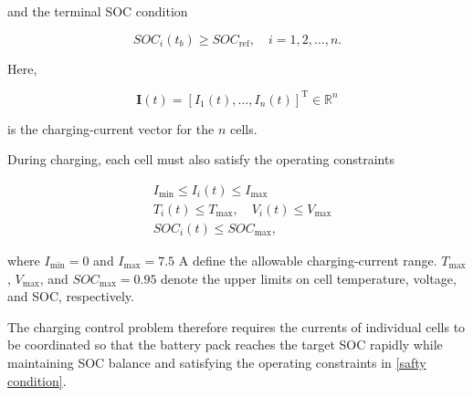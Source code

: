 and the terminal SOC condition

\begin{equation}\label{terminal condition}
    SOC_i(t_b)\geq SOC_{\mathrm{ref}},
    \quad i=1,2,\ldots,n.
\end{equation}

Here,

\begin{equation*}
    \mathbf{I}(t)
    =
    \left[
    I_1(t),\ldots,I_n(t)
    \right]^{\mathrm{T}}
    \in \mathbb{R}^{n}
\end{equation*}

is the charging-current vector for the $n$ cells.

During charging, each cell must also satisfy the operating constraints

\begin{equation}\label{safty condition}
    \begin{array}{rl}
    & I_{\min} \leq I_i(t) \leq I_{\max} \\[4pt]
    & T_i(t) \leq T_{\max}, \quad V_i(t) \leq V_{\max} \\[4pt]
    & SOC_i(t) \leq SOC_{\max},
    \end{array}
\end{equation}

where $I_{\min}=0$ and $I_{\max}=7.5$ A define the allowable charging-current range. 
$T_{\max}$, $V_{\max}$, and $SOC_{\max}=0.95$ denote the upper limits on cell temperature, voltage, and SOC, respectively.

The charging control problem therefore requires the currents of individual cells to be coordinated so that the battery pack reaches the target SOC rapidly while maintaining SOC balance and satisfying the operating constraints in \eqref{safty condition}. 
